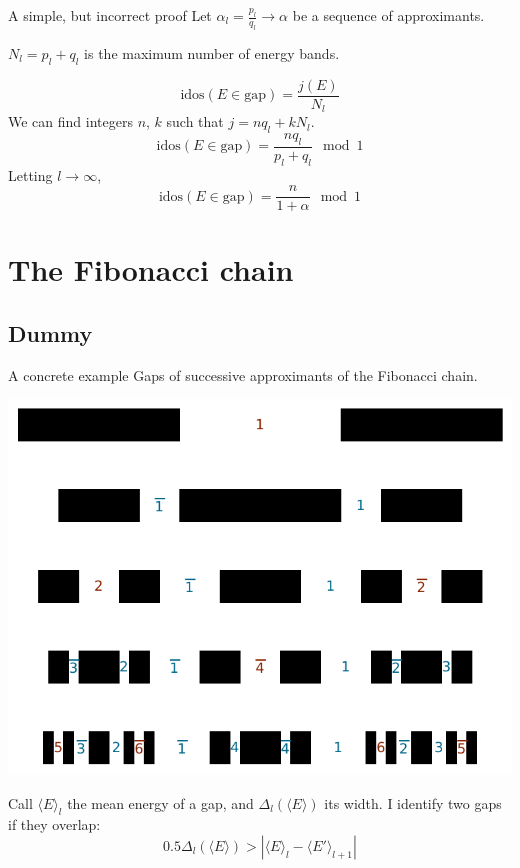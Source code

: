 \documentclass[xcolor=x11names,compress,professionalfonts]{beamer}
\renewcommand{\(}{\begin{columns}}
\renewcommand{\)}{\end{columns}}
\newcommand{\<}[1]{\begin{column}{#1}}
\renewcommand{\>}{\end{column}}
\newcommand{\id}{\ensuremath{\text{idos}}}
\newcommand{\me}{\ensuremath{\langle E \rangle}}
\newcommand{\mep}{\ensuremath{\langle E' \rangle}}
\begin{document}
\begin{frame}{A simple, but incorrect proof}
Let $\alpha_l = \frac{p_l}{q_l} \to \alpha$ be a sequence of approximants.

$N_l = p_l + q_l$ is the maximum number of energy bands.

\[
	\id(E \in \text{gap}) = \frac{j(E)}{N_l}
\]
We can find integers $n$, $k$ such that $j = n q_l + k N_l$.
\[
	\id(E \in \text{gap}) = \frac{n q_l}{p_l + q_l} \mod 1
\]
Letting $l \to \infty$,
	\[
		\id(E \in \text{gap}) = \frac{n}{1+\alpha} \mod 1
	\]

    

\end{frame}

\section{The Fibonacci chain}
\subsection{Dummy}

\begin{frame}{A concrete example}
Gaps of successive approximants of the Fibonacci chain.

{\centering
\includegraphics[scale=.6]{img/gap_labels.pdf}

}
Call $\me_l$ the mean energy of a gap, and $\Delta_l(\me)$ its width. 
I identify two gaps if they overlap:
\[
	0.5 \Delta_l(\me) > |\me_l - \mep_{l+1}|
\]
\end{frame}
\end{document}
